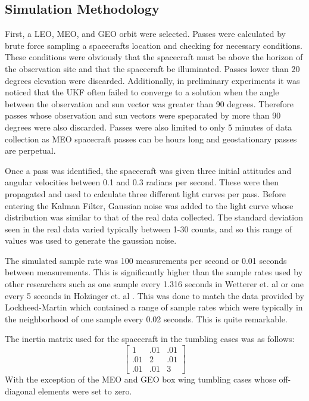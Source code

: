 \subsection{Simulation Methodology}

First, a LEO, MEO, and GEO orbit were selected. Passes were calculated by brute force sampling a spacecrafts location and checking for necessary conditions. These conditions were obviously that the spacecraft must be above the horizon of the observation site and that the spacecraft be illuminated. Passes lower than 20 degrees elevation were discarded. Additionally, in preliminary experiments it was noticed that the UKF often failed to converge to a solution when the angle between the observation and sun vector was greater than 90 degrees. Therefore passes whose observation and sun vectors were speparated by more than 90 degrees were also discarded. Passes were also limited to only 5 minutes of data collection as MEO spacecraft passes can be hours long and geostationary passes are perpetual.

Once a pass was identified, the spacecraft was given three initial attitudes and angular velocities between 0.1 and 0.3 radians per second. These were then propagated and used to calculate three different light curves per pass. Before entering the Kalman Filter, Gaussian noise was added to the light curve whose distribution was similar to that of the real data collected. The standard deviation seen in the real data varied typically between 1-30 counts, and so this range of values was used to generate the gaussian noise.

The simulated sample rate was 100 measurements per second or 0.01 seconds between measurements. This is significantly higher than the sample rates used by other researchers such as one sample every 1.316 seconds in Wetterer et. al \cite{wetterer_ukf} or one every 5 seconds in Holzinger et. al \cite{Holzinger2012AttitudeEF}. This was done to match the data provided by Lockheed-Martin which contained a range of sample rates which were typically in the neighborhood of one sample every 0.02 seconds. This is quite remarkable.

The inertia matrix used for the spacecraft in the tumbling cases was as follows:
\begin{equation}
\begin{bmatrix}
1 & .01 & .01 \\ .01 & 2 & .01 \\ .01 & .01 &3
\end{bmatrix}
\end{equation}
With the exception of the MEO and GEO box wing tumbling cases whose off-diagonal elements were set to zero.

